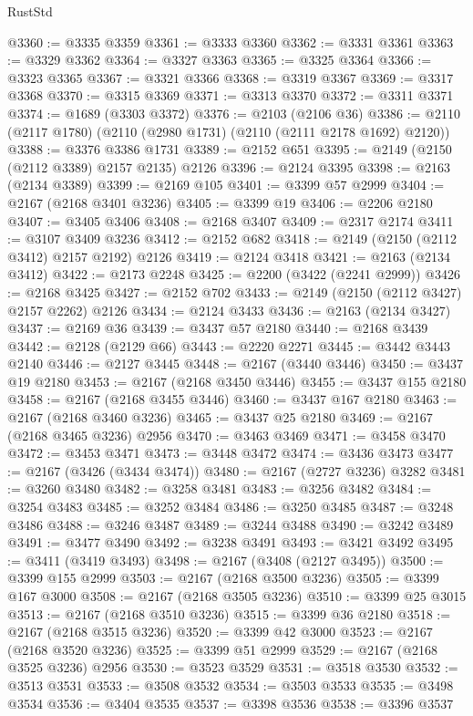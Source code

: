 \begin{lexlean}{RustStd}
\begin{coremodule}
@3360 := @3335 @3359
@3361 := @3333 @3360
@3362 := @3331 @3361
@3363 := @3329 @3362
@3364 := @3327 @3363
@3365 := @3325 @3364
@3366 := @3323 @3365
@3367 := @3321 @3366
@3368 := @3319 @3367
@3369 := @3317 @3368
@3370 := @3315 @3369
@3371 := @3313 @3370
@3372 := @3311 @3371
@3374 := @1689 (@3303 @3372)
@3376 := @2103 (@2106 @36)
@3386 := @2110 (@2117 @1780) (@2110 (@2980 @1731) (@2110 (@2111 @2178 @1692) @2120))
@3388 := @3376 @3386 @1731
@3389 := @2152 @651
@3395 := @2149 (@2150 (@2112 @3389) @2157 @2135) @2126
@3396 := @2124 @3395
@3398 := @2163 (@2134 @3389)
@3399 := @2169 @105
@3401 := @3399 @57 @2999
@3404 := @2167 (@2168 @3401 @3236)
@3405 := @3399 @19
@3406 := @2206 @2180
@3407 := @3405 @3406
@3408 := @2168 @3407
@3409 := @2317 @2174
@3411 := @3107 @3409 @3236
@3412 := @2152 @682
@3418 := @2149 (@2150 (@2112 @3412) @2157 @2192) @2126
@3419 := @2124 @3418
@3421 := @2163 (@2134 @3412)
@3422 := @2173 @2248
@3425 := @2200 (@3422 (@2241 @2999))
@3426 := @2168 @3425
@3427 := @2152 @702
@3433 := @2149 (@2150 (@2112 @3427) @2157 @2262) @2126
@3434 := @2124 @3433
@3436 := @2163 (@2134 @3427)
@3437 := @2169 @36
@3439 := @3437 @57 @2180
@3440 := @2168 @3439
@3442 := @2128 (@2129 @66)
@3443 := @2220 @2271
@3445 := @3442 @3443 @2140
@3446 := @2127 @3445
@3448 := @2167 (@3440 @3446)
@3450 := @3437 @19 @2180
@3453 := @2167 (@2168 @3450 @3446)
@3455 := @3437 @155 @2180
@3458 := @2167 (@2168 @3455 @3446)
@3460 := @3437 @167 @2180
@3463 := @2167 (@2168 @3460 @3236)
@3465 := @3437 @25 @2180
@3469 := @2167 (@2168 @3465 @3236) @2956
@3470 := @3463 @3469
@3471 := @3458 @3470
@3472 := @3453 @3471
@3473 := @3448 @3472
@3474 := @3436 @3473
@3477 := @2167 (@3426 (@3434 @3474))
@3480 := @2167 (@2727 @3236) @3282
@3481 := @3260 @3480
@3482 := @3258 @3481
@3483 := @3256 @3482
@3484 := @3254 @3483
@3485 := @3252 @3484
@3486 := @3250 @3485
@3487 := @3248 @3486
@3488 := @3246 @3487
@3489 := @3244 @3488
@3490 := @3242 @3489
@3491 := @3477 @3490
@3492 := @3238 @3491
@3493 := @3421 @3492
@3495 := @3411 (@3419 @3493)
@3498 := @2167 (@3408 (@2127 @3495))
@3500 := @3399 @155 @2999
@3503 := @2167 (@2168 @3500 @3236)
@3505 := @3399 @167 @3000
@3508 := @2167 (@2168 @3505 @3236)
@3510 := @3399 @25 @3015
@3513 := @2167 (@2168 @3510 @3236)
@3515 := @3399 @36 @2180
@3518 := @2167 (@2168 @3515 @3236)
@3520 := @3399 @42 @3000
@3523 := @2167 (@2168 @3520 @3236)
@3525 := @3399 @51 @2999
@3529 := @2167 (@2168 @3525 @3236) @2956
@3530 := @3523 @3529
@3531 := @3518 @3530
@3532 := @3513 @3531
@3533 := @3508 @3532
@3534 := @3503 @3533
@3535 := @3498 @3534
@3536 := @3404 @3535
@3537 := @3398 @3536
@3538 := @3396 @3537

\end{coremodule}
\end{lexlean}
